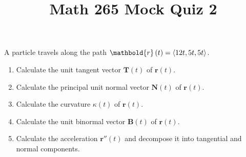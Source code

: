 \documentclass[12pt]{article}
\title{Math 265 Mock Quiz 2}\author{}\date{}
\let\cos\relax\DeclareMathOperator{\cos}{\mathsf{cos}}
\let\sin\relax\DeclareMathOperator{\sin}{\mathsf{sin}}
\begin{document}
\maketitle
\thispagestyle{empty}
A particle travels along the path
$\mathbold{r}\left(t\right)=\left\langle
12t,5\cos{t},5\sin{t}\right\rangle$.
\begin{enumerate}
\item Calculate the unit tangent vector
$\mathbold{T}\left(t\right)$ of $\mathbold{r}\left(t\right)$.
\vspace{3cm}
\item Calculate the principal unit normal vector
$\mathbold{N}\left(t\right)$ of $\mathbold{r}\left(t\right)$.
\vspace{3cm}
\item Calculate the curvature $\kappa\left(t\right)$
of $\mathbold{r}\left(t\right)$.
\vspace{3cm}
\item Calculate the unit binormal vector
$\mathbold{B}\left(t\right)$ of $\mathbold{r}\left(t\right)$.
\vspace{3cm}
\item Calculate the acceleration $\mathbold{r}''\left(t\right)$
and decompose it into tangential and normal components.
\end{enumerate}
\end{document}
